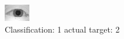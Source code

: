 \begin{figure}[h!]
\begin{center}
\includegraphics[width=0.60\columnwidth]{figures/ID900_class_1_target_2.png}
\end{center}
\caption{ Classification: 1 actual target: 2}
\label{fig:ID900_class_1_target_2}
\end{figure}
